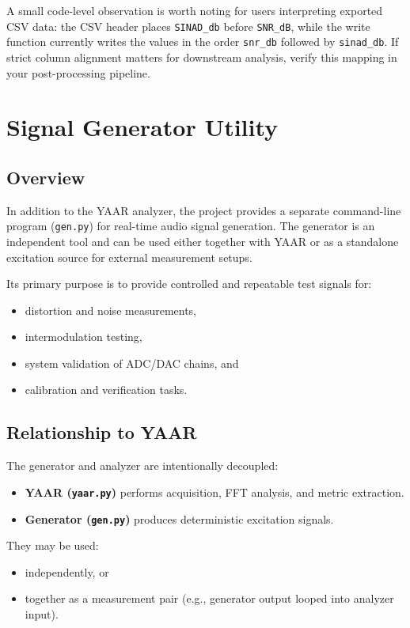 \documentclass[conference]{IEEEtran}
\begin{document}
A small code-level observation is worth noting for users interpreting exported CSV data: the CSV header places \texttt{SINAD\_db} before \texttt{SNR\_dB}, while the write function currently writes the values in the order \texttt{snr\_db} followed by \texttt{sinad\_db}. If strict column alignment matters for downstream analysis, verify this mapping in your post-processing pipeline.

\section{Signal Generator Utility}

\subsection{Overview}
In addition to the YAAR analyzer, the project provides a separate command-line program (\texttt{gen.py}) for real-time audio signal generation. The generator is an independent tool and can be used either together with YAAR or as a standalone excitation source for external measurement setups.

Its primary purpose is to provide controlled and repeatable test signals for:
\begin{itemize}[leftmargin=*,nosep]
    \item distortion and noise measurements,
    \item intermodulation testing,
    \item system validation of ADC/DAC chains, and
    \item calibration and verification tasks.
\end{itemize}

\subsection{Relationship to YAAR}
The generator and analyzer are intentionally decoupled:
\begin{itemize}[leftmargin=*,nosep]
    \item \textbf{YAAR (\texttt{yaar.py})} performs acquisition, FFT analysis, and metric extraction.
    \item \textbf{Generator (\texttt{gen.py})} produces deterministic excitation signals.
\end{itemize}

They may be used:
\begin{itemize}[leftmargin=*,nosep]
    \item independently, or
    \item together as a measurement pair (e.g., generator output looped into analyzer input).
\end{itemize}
\end{document}
